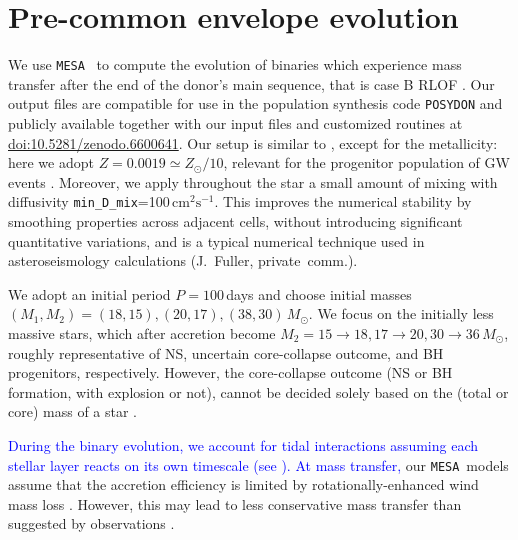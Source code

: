\documentclass[twocolumn,twocolappendix,trackchanges]{aastex63}
\newcommand{\code}[1]{\texttt{#1}}
\newcommand{\mesa}{\code{MESA}}
\begin{document}
\section{Pre-common envelope evolution}
\label{sec:methods}

We use \mesa\ \citep[version 15140,][]{paxton:2011, paxton:2013,
  paxton:2015, paxton:2018, paxton:2019, jermyn:2022} to compute the evolution of
binaries which experience mass transfer after the end of the donor's
main sequence, that is case B RLOF
\citep[][]{kippenhahn:1967}. Our output files are compatible for
use in the population synthesis code \code{POSYDON}
\citep{fragos:2022} and publicly available together with our input
files and customized routines at
\href{https://zenodo.org/deposit/6600641}{doi:10.5281/zenodo.6600641}.
Our setup is similar to \cite{renzo:2021zoph}, except for the
metallicity: here we adopt $Z=0.0019\simeq Z_\odot/10$, relevant for
the progenitor population of GW events \citep[e.g.,][]{vanson:2021}.
Moreover, we apply throughout the star a small amount of mixing with
diffusivity \texttt{min\_D\_mix}=100\,$\mathrm{cm^2 s^{-1}}$. This
improves the numerical stability by smoothing properties across
adjacent cells, without introducing significant quantitative
variations, and is a typical numerical technique used in
asteroseismology calculations (J.~Fuller, private~comm.).

We adopt an initial period $P=100$\,days and choose initial masses
$(M_{1}, M_{2}) = (18, 15), (20, 17), (38, 30)\,M_\odot$. We focus on
the initially less massive stars, which after accretion become
$M_2=15\rightarrow 18, 17\rightarrow 20, 30\rightarrow 36\,M_\odot$,
roughly representative of NS, uncertain core-collapse outcome, and BH
progenitors, respectively. However, the core-collapse outcome (NS or
BH formation, with explosion or not), cannot be decided solely based
on the (total or core) mass of a star \citep[e.g.,][]{oconnor:11,
  farmer:16, patton:2020, zapartas:21b, patton:22}.

\textcolor{blue}{During the binary evolution, we account for tidal
  interactions assuming each stellar layer reacts on its own timescale
  (see \citealt{paxton:2015}). At mass transfer,} our \mesa\ models
assume that the accretion efficiency is limited by
rotationally-enhanced wind mass loss \citep[e.g.,][]{sravan:2019,
  wang:2020, renzo:2021zoph, sen:2022}. However, this may lead to less
conservative mass transfer than suggested by observations
\citep[e.g.,][]{wang:2021a,renzo:2021zoph}.
\end{document}
